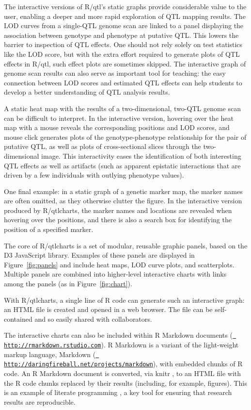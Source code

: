 \documentclass[12pt,letterpaper]{article}
\begin{document}
The interactive versions of R/qtl's static graphs provide considerable
value to the user, enabling a deeper and more rapid exploration of
QTL mapping results. The LOD curves from a single-QTL genome scan are
linked to a panel displaying the association between genotype and
phenotype at putative QTL. This lowers the barrier to inspection of
QTL effects. One should not rely solely on test statistics like the
LOD score, but with the extra effort required to generate plots of QTL
effects in R/qtl, such effect plots are sometimes skipped. The
interactive graph of genome scan results can also serve as important
tool for teaching: the easy connection between LOD scores and
estimated QTL effects can help students to develop a better
understanding of QTL analysis results.

A static heat map with the results of a two-dimensional, two-QTL
genome scan can be difficult to interpret.  In the interactive
version, hovering over the heat map with a mouse reveals the
corresponding positions and LOD scores, and mouse click generates
plots of the genotype-phenotype relationship for the pair of putative
QTL, as well as plots of cross-sectional slices through the
two-dimensional image. This interactivity eases the
identification of both interesting QTL effects as well as artifacts (such
as apparent epistatic interactions that are driven by a few
individuals with outlying phenotype values).

One final example: in a static graph of a genetic marker map, the
marker names are often omitted, as they otherwise clutter the
figure. In the interactive version produced by R/qtlcharts, the marker
names and locations are revealed when hovering over the positions, and
there is also a search box for identifying the position of a
specified marker.

The core of R/qtlcharts is a set of modular, reusable graphic panels,
based on the D3 JavaScript library.  Examples of these panels are
displayed in Figure~\ref{fig:panels} and include heat maps, LOD curve
plots, and scatterplots. Multiple panels are combined into
higher-level interactive charts with links among the panels (as in
Figure~\ref{fig:chart}).

With R/qtlcharts, a single line of R code can generate such an
interactive graph: an HTML file is created and opened in a web
browser. The file can be self-contained and so easily shared with
collaborators.

The interactive charts can also be included within R Markdown
documents (\href{http://rmarkdown.rstudio.com}{\tt \small
http://rmarkdown.rstudio.com}). R Markdown is a variant of
the light-weight markup language, Markdown
(\href{http://daringfireball.net/projects/markdown}{\tt \small
http://daringfireball.net/projects/markdown}), with embedded chunks
of R code. An R Markdown document is converted, via knitr
\citep[\href{http://yihui.name/knitr}{\tt \small
http://yihui.name/knitr}]{Xie2013}, to an HTML file with the R
code chunks replaced by their results (including, for example,
figures). This is an example of literate programming
\citep{Knuth1984}, a key tool for ensuring that research results are
reproducible.
\end{document}
